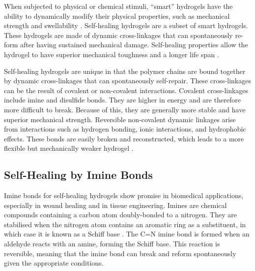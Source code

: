 When subjected to physical or chemical stimuli, ``smart'' hydrogels have the ability to dynamically modify their physical properties, such as mechanical strength and swellability \autocite{hoHydrogelsPropertiesApplications2022}.
Self-healing hydrogels are a subset of smart hydrogels. These hydrogels are made of dynamic cross-linkages that can spontaneously re-form after having sustained mechanical damage. Self-healing properties allow the hydrogel to have superior mechanical toughness and a longer life span \autocite{deviv.k.SelfHealingHydrogelsPreparation2021}.

Self-healing hydrogels are unique in that the polymer chains are bound together by dynamic cross-linkages that can spontaneously self-repair. These cross-linkages can be the result of covalent or non-covalent interactions.
Covalent cross-linkages include imine and disulfide bonds. They are higher in energy and are therefore more difficult to break. Because of this, they are generally more stable and have superior mechanical strength.
Reversible non-covalent dynamic linkages arise from interactions such as hydrogen bonding, ionic interactions, and hydrophobic effects. These bonds are easily broken and reconstructed, which leads to a more flexible but mechanically weaker hydrogel \autocite{deviv.k.SelfHealingHydrogelsPreparation2021}.

\subsection{Self-Healing by Imine Bonds}

Imine bonds for self-healing hydrogels show promise in biomedical applications, especially in wound healing and in tissue engineering. Imines are chemical compounds containing a carbon atom doubly-bonded to a nitrogen. They are stabilised when the nitrogen atom contains an aromatic ring as a substituent, in which case it is known as a Schiff base \autocite{moldoveanuChapter8Pyrolysis2019}.
The C=N imine bond is formed when an aldehyde reacts with an amine, forming the Schiff base. This reaction is reversible, meaning that the imine bond can break and reform spontaneously given the appropriate conditions.